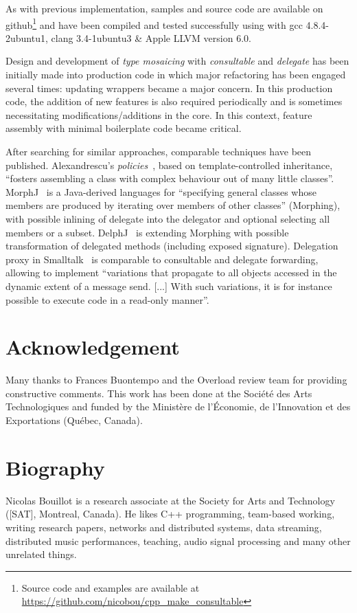 \documentclass{article}
\begin{document}
As with previous implementation, samples and source code are available on github\footnote{Source code and examples are available at \url{https://github.com/nicobou/cpp_make_consultable}} and have been compiled and tested successfully using with gcc 4.8.4-2ubuntu1, clang 3.4-1ubuntu3 \& Apple LLVM version 6.0.

Design and development of \textit{type mosaicing} with \textit{consultable} and \textit{delegate} has been initially made into production code in which major refactoring has been engaged several times: updating wrappers became a major concern. In this production code, the addition of new features is also required periodically and is sometimes necessitating modifications/additions in the core. In this context, feature assembly with minimal boilerplate code became critical. 

After searching for similar approaches, comparable techniques have been published. Alexandrescu's \textit{policies}~\cite{Alexandrescu2001}, based on template-controlled inheritance, ``fosters assembling a class with complex behaviour out of many little classes''. MorphJ~\cite{Huang2011} is a Java-derived languages for ``specifying general classes whose members are produced by iterating over members of other classes'' (Morphing), with possible inlining of delegate into the delegator and optional selecting all members or a subset. DelphJ~\cite{2013gerakios} is extending Morphing with possible transformation of delegated methods (including exposed signature). Delegation proxy in Smalltalk~\cite{2014wernli} is comparable to consultable and delegate forwarding, allowing to implement ``variations that propagate to all objects accessed in the dynamic extent of a message send. [...] With such variations, it is for instance possible to execute code in a read-only manner''.                    

\section{Acknowledgement}
Many thanks to Frances Buontempo and the Overload review team for providing constructive comments. This work has been done at the Société des Arts Technologiques and funded by the Ministère de l'Économie, de l'Innovation et des Exportations (Québec, Canada).




\section{Biography}
 Nicolas Bouillot is a research associate at the Society for Arts and Technology ([SAT], Montreal, Canada). He likes C++ programming, team-based working, writing research papers, networks and distributed systems, data streaming, distributed music performances, teaching, audio signal processing and many other unrelated things.
\end{document}
